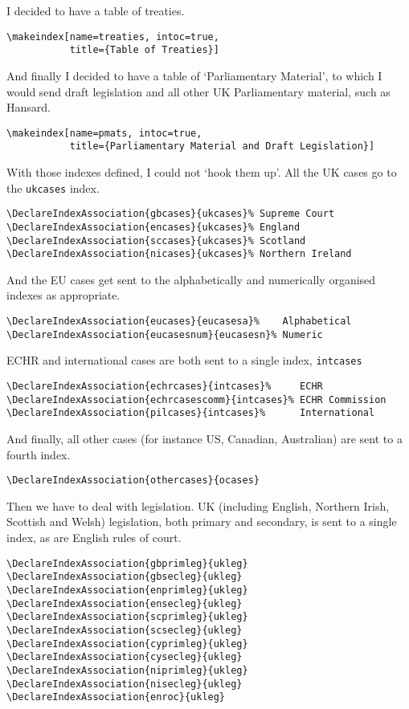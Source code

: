 \documentclass[a5paper,fontsize=9pt,DIV=1]{scrartcl}
\begin{document}
I decided to have a table of treaties.
\begin{verbatim}
\makeindex[name=treaties, intoc=true,
           title={Table of Treaties}]
\end{verbatim}

And finally I decided to have a table of `Parliamentary Material', to which I would send draft legislation and all other UK Parliamentary material, such as Hansard.

\begin{verbatim}
\makeindex[name=pmats, intoc=true,
           title={Parliamentary Material and Draft Legislation}]
\end{verbatim}

With those indexes defined, I could not `hook them up'. All the UK cases go to the \texttt{ukcases} index.
\begin{verbatim}
\DeclareIndexAssociation{gbcases}{ukcases}% Supreme Court
\DeclareIndexAssociation{encases}{ukcases}% England
\DeclareIndexAssociation{sccases}{ukcases}% Scotland
\DeclareIndexAssociation{nicases}{ukcases}% Northern Ireland
\end{verbatim}

And the EU cases get sent to the alphabetically and numerically organised indexes as appropriate.
\begin{verbatim}
\DeclareIndexAssociation{eucases}{eucasesa}%    Alphabetical
\DeclareIndexAssociation{eucasesnum}{eucasesn}% Numeric
\end{verbatim}

ECHR and international cases are both sent to a single index, \texttt{intcases}
\begin{verbatim}
\DeclareIndexAssociation{echrcases}{intcases}%     ECHR
\DeclareIndexAssociation{echrcasescomm}{intcases}% ECHR Commission
\DeclareIndexAssociation{pilcases}{intcases}%      International
\end{verbatim}

And finally, all other cases (for instance US, Canadian, Australian) are sent to a fourth index.

\begin{verbatim}
\DeclareIndexAssociation{othercases}{ocases}
\end{verbatim}

Then we have to deal with legislation. UK (including English, Northern Irish, Scottish and Welsh) legislation, both primary and secondary, is sent to a single index, as are English rules of court.
\begin{verbatim}
\DeclareIndexAssociation{gbprimleg}{ukleg}
\DeclareIndexAssociation{gbsecleg}{ukleg}
\DeclareIndexAssociation{enprimleg}{ukleg}
\DeclareIndexAssociation{ensecleg}{ukleg}
\DeclareIndexAssociation{scprimleg}{ukleg}
\DeclareIndexAssociation{scsecleg}{ukleg}
\DeclareIndexAssociation{cyprimleg}{ukleg}
\DeclareIndexAssociation{cysecleg}{ukleg}
\DeclareIndexAssociation{niprimleg}{ukleg}
\DeclareIndexAssociation{nisecleg}{ukleg}
\DeclareIndexAssociation{enroc}{ukleg}
\end{verbatim}
\end{document}
